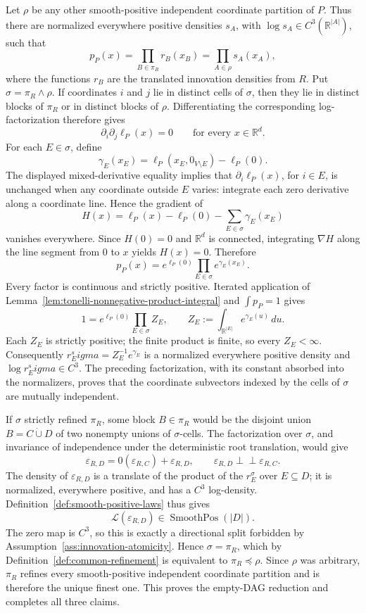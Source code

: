 Let \(\rho\) be any other smooth-positive independent coordinate partition of \(P\).  Thus there are normalized everywhere positive densities \(s_A\), with \(\log s_A\in C^3(\mathbb R^{|A|})\), such that
\[
 p_P(x)=\prod_{B\in\pi_R}r_B(x_B)=\prod_{A\in\rho}s_A(x_A),
\]
where the functions \(r_B\) are the translated innovation densities from \(R\).  Put \(\sigma=\pi_R\wedge\rho\).  If coordinates \(i\) and \(j\) lie in distinct cells of \(\sigma\), then they lie in distinct blocks of \(\pi_R\) or in distinct blocks of \(\rho\).  Differentiating the corresponding log-factorization therefore gives
\[
 \partial_i\partial_j\ell_P(x)=0
 \qquad\text{for every }x\in\mathbb R^d.
\]
For each \(E\in\sigma\), define
\[
 \gamma_E(x_E)=\ell_P(x_E,0_{V\setminus E})-\ell_P(0).
\]
The displayed mixed-derivative equality implies that \(\partial_i\ell_P(x)\), for \(i\in E\), is unchanged when any coordinate outside \(E\) varies: integrate each zero derivative along a coordinate line.  Hence the gradient of
\[
 H(x)=\ell_P(x)-\ell_P(0)-\sum_{E\in\sigma}\gamma_E(x_E)
\]
vanishes everywhere.  Since \(H(0)=0\) and \(\mathbb R^d\) is connected, integrating \(\nabla H\) along the line segment from \(0\) to \(x\) yields \(H(x)=0\).  Therefore
\[
 p_P(x)=e^{\ell_P(0)}\prod_{E\in\sigma}e^{\gamma_E(x_E)}.
\]
Every factor is continuous and strictly positive.  Iterated application of Lemma~\ref{lem:tonelli-nonnegative-product-integral} and \(\int p_P=1\) gives
\[
 1=e^{\ell_P(0)}\prod_{E\in\sigma}Z_E,
 \qquad
 Z_E:=\int_{\mathbb R^{|E|}}e^{\gamma_E(u)}\,du.
\]
Each \(Z_E\) is strictly positive; the finite product is finite, so every \(Z_E<\infty\).  Consequently \(r_E^sigma=Z_E^{-1}e^{\gamma_E}\) is a normalized everywhere positive density and \(\log r_E^sigma\in C^3\).  The preceding factorization, with its constant absorbed into the normalizers, proves that the coordinate subvectors indexed by the cells of \(\sigma\) are mutually independent.

If \(\sigma\) strictly refined \(\pi_R\), some block \(B\in\pi_R\) would be the disjoint union \(B=C\mathbin{\dot\cup}D\) of two nonempty unions of \(\sigma\)-cells.  The factorization over \(\sigma\), and invariance of independence under the deterministic root translation, would give
\[
 \varepsilon_{R,D}=0(\varepsilon_{R,C})+\varepsilon_{R,D},
 \qquad
 \varepsilon_{R,D}\perp\!\!\!\perp\varepsilon_{R,C}.
\]
The density of \(\varepsilon_{R,D}\) is a translate of the product of the \(r_E^\sigma\) over \(E\subseteq D\); it is normalized, everywhere positive, and has a \(C^3\) log-density.  Definition~\ref{def:smooth-positive-laws} thus gives
\[
 \mathcal L(\varepsilon_{R,D})\in\operatorname{SmoothPos}(|D|).
\]
The zero map is \(C^3\), so this is exactly a directional split forbidden by Assumption~\ref{ass:innovation-atomicity}.  Hence \(\sigma=\pi_R\), which by Definition~\ref{def:common-refinement} is equivalent to \(\pi_R\preceq\rho\).  Since \(\rho\) was arbitrary, \(\pi_R\) refines every smooth-positive independent coordinate partition and is therefore the unique finest one.  This proves the empty-DAG reduction and completes all three claims.